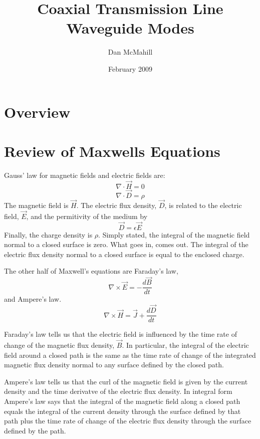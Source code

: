 \documentclass[11pt]{article}
\title{Coaxial Transmission Line Waveguide Modes}
\author{Dan McMahill}
\date{February 2009}
\begin{document}
\maketitle

\section{Overview}

\section{Review of Maxwells Equations}

Gauss' law for magnetic fields and electric fields are:
\begin{equation}
\nabla \cdot \vec{H} = 0
\end{equation}
\begin{equation}
\nabla \cdot \vec{D} = \rho
\end{equation}
The magnetic field is $\vec{H}$.  The electric flux density, $\vec{D}$, is related
to the electric field, $\vec{E}$, and the permitivity of the medium by
\begin{equation}
\vec{D} = \epsilon \vec{E}
\end{equation}
Finally, the charge density is $\rho$.  Simply stated, the integral of
the magnetic field normal to a closed surface is zero.  What goes in,
comes out.  The integral of the electric flux density normal to a
closed surface is equal to the enclosed charge.

The other half of Maxwell's equations are Faraday's law,
\begin{equation}
\nabla \times \vec{E} = - \frac{d \vec{B}}{d t}
\end{equation}
and Ampere's law.
\begin{equation}
\nabla \times \vec{H} = \vec{J} + \frac{d \vec{D}}{d t}
\end{equation}

Faraday's law tells us that the electric field is influenced by the
time rate of change of the magnetic flux density, $\vec{B}$.  In particular,
the integral of the electric field around a closed path is the same as
the time rate of change of the integrated magnetic flux density normal
to any surface defined by the closed path.

Ampere's law tells us that the curl of the magnetic field is given by
the current density and the time derivatve of the electric flux density.  In
integral form Ampere's law says that the integral of the magnetic field
along a closed path equals the integral of the current density through
the surface defined by that path plus the time rate of change of the
electric flux density through the surface defined by the path.
\end{document}
